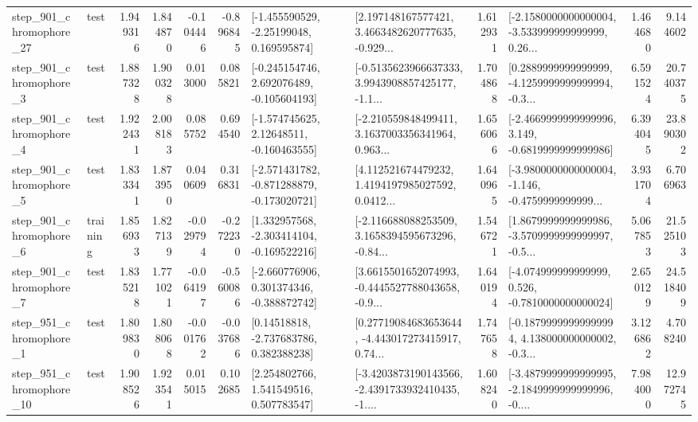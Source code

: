 \begin{tabular}{llrrrrllrlrr}
  step\_901\_chromophore\_27 &      test &      1.949316 &    1.844870 &     -0.104446 & -0.896845 &    [-1.455590529, -2.25199048, 0.169595874] &  [2.197148167577421, 3.4663482620777635, -0.929... &       1.612931 &  [-2.1580000000000004, -3.533999999999999, 0.26... &            1.464680 &          9.144602 \\
   step\_901\_chromophore\_3 &      test &      1.887328 &    1.900328 &      0.013000 &  0.085821 &   [-0.245154746, 2.692076489, -0.105604193] &  [-0.5135623966637333, 3.9943908857425177, -1.1... &       1.704868 &  [0.2889999999999999, -4.1259999999999994, -0.3... &            6.591524 &         20.740375 \\
   step\_901\_chromophore\_4 &      test &      1.922431 &    2.008183 &      0.085752 &  0.694540 &    [-1.574745625, 2.12648511, -0.160463555] &  [-2.210559848499411, 3.1637003356341964, 0.963... &       1.656066 &  [-2.4669999999999996, 3.149, -0.6819999999999986] &            6.394045 &         23.890302 \\
   step\_901\_chromophore\_5 &      test &      1.833341 &    1.873950 &      0.040609 &  0.316831 &  [-2.571431782, -0.871288879, -0.173020721] &  [4.112521674479232, 1.4194197985027592, 0.0412... &       1.640965 &  [-3.9800000000000004, -1.146, -0.4759999999999... &            3.931704 &          6.706963 \\
   step\_901\_chromophore\_6 &  training &      1.856933 &    1.827139 &     -0.029794 & -0.272230 &   [1.332957568, -2.303414104, -0.169522216] &  [-2.116688088253509, 3.1658394595673296, -0.84... &       1.546721 &  [1.8679999999999986, -3.5709999999999997, -0.5... &            5.067853 &         21.525103 \\
   step\_901\_chromophore\_7 &      test &      1.835218 &    1.771021 &     -0.064197 & -0.560086 &   [-2.660776906, 0.301374346, -0.388872742] &  [3.6615501652074993, -0.4445527788043658, -0.9... &       1.640194 &   [-4.074999999999999, 0.526, -0.7810000000000024] &            2.650129 &         24.518409 \\
   step\_951\_chromophore\_1 &      test &      1.809830 &    1.808068 &     -0.001762 & -0.037686 &     [0.14518818, -2.737683786, 0.382388238] &  [0.27719084683653644, -4.443017273415917, 0.74... &       1.747658 &  [-0.18799999999999994, 4.138000000000002, -0.3... &            3.126862 &          4.708240 \\
  step\_951\_chromophore\_10 &      test &      1.908526 &    1.923541 &      0.015015 &  0.102685 &     [2.254802766, 1.541549516, 0.507783547] &  [-3.4203873190143566, -2.4391733932410435, -1.... &       1.608240 &  [-3.4879999999999995, -2.1849999999999996, -0.... &            7.984000 &         12.972745 \\

\end{tabular}
